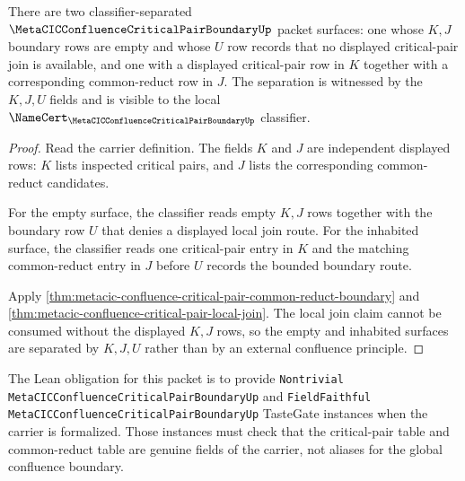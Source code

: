 \begin{theorem}
\label{thm:metacic-confluence-critical-pair-nontrivial-witness-surface}
There are two classifier-separated $\MetaCICConfluenceCriticalPairBoundaryUp$ packet surfaces: one whose $K,J$ boundary rows are empty and whose $U$ row records that no displayed critical-pair join is available, and one with a displayed critical-pair row in $K$ together with a corresponding common-reduct row in $J$. The separation is witnessed by the $K,J,U$ fields and is visible to the local $\NameCert_{\MetaCICConfluenceCriticalPairBoundaryUp}$ classifier.
\end{theorem}
\begin{proof}
Read the carrier definition. The fields $K$ and $J$ are independent displayed rows: $K$ lists inspected critical pairs, and $J$ lists the corresponding common-reduct candidates.

For the empty surface, the classifier reads empty $K,J$ rows together with the boundary row $U$ that denies a displayed local join route. For the inhabited surface, the classifier reads one critical-pair entry in $K$ and the matching common-reduct entry in $J$ before $U$ records the bounded boundary route.

Apply \autoref{thm:metacic-confluence-critical-pair-common-reduct-boundary} and \autoref{thm:metacic-confluence-critical-pair-local-join}. The local join claim cannot be consumed without the displayed $K,J$ rows, so the empty and inhabited surfaces are separated by $K,J,U$ rather than by an external confluence principle.
\end{proof}

The Lean obligation for this packet is to provide
\texttt{Nontrivial MetaCICConfluenceCriticalPairBoundaryUp} and
\texttt{FieldFaithful MetaCICConfluenceCriticalPairBoundaryUp} TasteGate
instances when the carrier is formalized. Those instances must check that the
critical-pair table and common-reduct table are genuine fields of the carrier,
not aliases for the global confluence boundary.


